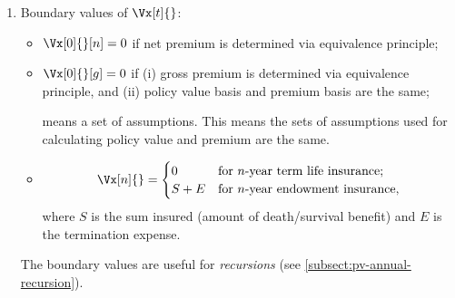 \begin{enumerate}
\item \label{it:pv-boundary-values}
Boundary values of \(\Vx[t]{}\):
\begin{itemize}
\item \(\Vx[0]{}[n]=0\) if net premium is determined via equivalence principle;
\item \(\Vx[0]{}[g]=0\) if (i) gross premium is determined via equivalence
principle, and (ii) policy value basis and premium basis are the same;
\begin{note}
 means a set of assumptions. This means the sets of assumptions
used for calculating policy value and premium are the same.
\end{note}
\item \[
\Vx[n]{}
=\begin{cases}
0&\text{for \(n\)-year term life insurance}; \\
S+E&\text{for \(n\)-year endowment insurance},
\end{cases}
\]
where \(S\) is the sum insured (amount of death/survival benefit) and \(E\) is
the termination expense.
\end{itemize}
\begin{note}
The boundary values are useful for \emph{recursions} (see
\cref{subsect:pv-annual-recursion}).
\end{note}
\end{enumerate}
